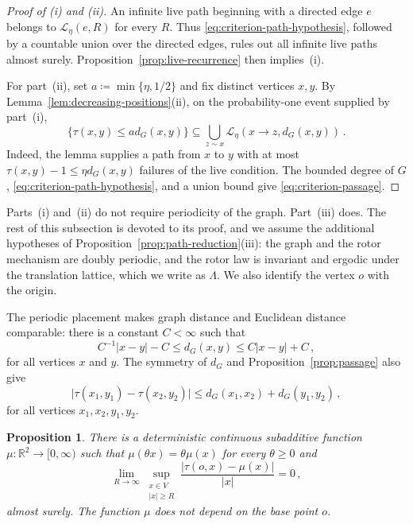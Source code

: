 \documentclass[11pt]{amsart}
\theoremstyle{plain}
\newtheorem{proposition}[theorem]{Proposition}
\theoremstyle{definition}
\newcommand{\R}{\mathbb R}
\begin{document}
	\begin{proof}[Proof of \textup{(i)} and \textup{(ii)}]
		An infinite live path beginning with a directed edge $e$ belongs to
		$\mathcal L_\eta(e,R)$ for every $R$.  Thus
		\eqref{eq:criterion-path-hypothesis}, followed by a countable union over the
		directed edges, rules out all infinite live paths almost surely.
		Proposition~\ref{prop:live-recurrence} then implies~\textup{(i)}.
		
		For part~\textup{(ii)}, set $a\coloneqq\min\{\eta,1/2\}$ and fix distinct
		vertices $x,y$.  By
		Lemma~\ref{lem:decreasing-positions}\textup{(ii)}, on the probability-one
		event supplied by part~\textup{(i)},
		\begin{equation}\label{eq:fast-passage-inclusion}
			\{\tau(x,y)\leq ad_G(x,y)\}
			\subseteq
			\bigcup_{z\sim x}\mathcal L_\eta(x\to z,d_G(x,y))\, .
		\end{equation}
		Indeed, the lemma supplies a path from $x$ to $y$ with at most
		$\tau(x,y)-1\leq\eta d_G(x,y)$ failures of the live condition.  The bounded
		degree of $G$, \eqref{eq:criterion-path-hypothesis}, and a union bound give
		\eqref{eq:criterion-passage}.
	\end{proof}
	
	Parts~\textup{(i)} and~\textup{(ii)} do not require periodicity of the graph.
	Part~\textup{(iii)} does.  The rest of this subsection is devoted to its
	proof, and we assume the additional hypotheses of
	Proposition~\ref{prop:path-reduction}\textup{(iii)}: the graph and the rotor
	mechanism are doubly periodic, and the rotor law is invariant and ergodic
	under the translation lattice, which we write as $\Lambda$. We also identify the vertex $o$ with the origin. 
	
	
	The periodic placement makes graph distance and Euclidean distance comparable:
	there is a constant $C<\infty$ such that
	\begin{equation}\label{eq:distance-comparison}
		C^{-1}|x-y|-C
		\leq d_G(x,y)
		\leq C|x-y|+C\, ,
	\end{equation}
	for all vertices $x$ and $y$.  The symmetry of $d_G$ and
	Proposition~\ref{prop:passage} also give
	\begin{equation}\label{eq:passage-four-endpoints}
		\bigl|\tau(x_1,y_1)-\tau(x_2,y_2)\bigr|
		\leq d_G(x_1,x_2)+d_G(y_1,y_2)\, ,
	\end{equation}
	for all vertices $x_1,x_2,y_1,y_2$. 
	
	\begin{proposition}\label{prop:passage-limit}
		There is a deterministic continuous subadditive function
		$\mu:\R^2\to[0,\infty)$ such that $\mu(\theta x)=\theta\mu(x)$ for every
		$\theta\geq0$ and
		\begin{equation}\label{eq:uniform-passage}
			\lim_{R\to\infty}
			\sup_{\substack{x\in V\\ |x|\geq R}}
			\frac{|\tau(o,x)-\mu(x)|}{|x|}=0\, ,
		\end{equation}
		almost surely.  The function $\mu$ does not depend on the base point $o$.
	\end{proposition}
	
\end{document}
